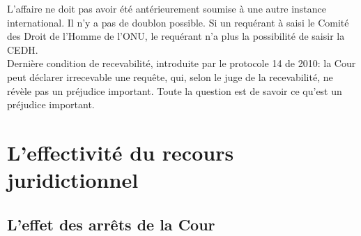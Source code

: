 \documentclass[10pt, a4paper, openany]{book}
\begin{document}
L'affaire ne doit pas avoir été antérieurement soumise à une autre instance international. Il n'y a pas de doublon possible. Si un requérant à saisi le Comité des Droit de l'Homme de l'ONU, le requérant n'a plus la possibilité de saisir la CEDH. \\
Dernière condition de recevabilité, introduite par le protocole 14 de 2010: la Cour peut déclarer irrecevable une requête, qui, selon le juge de la recevabilité, ne révèle pas un préjudice important. Toute la question est de savoir ce qu'est un préjudice important. 

\section{L'effectivité du recours juridictionnel}

\subsection{L'effet des arrêts de la Cour}
\end{document}
